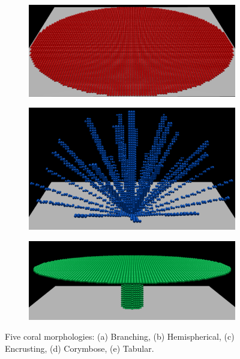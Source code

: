 \documentclass[9pt]{pnas-new}
\begin{document}
\begin{figure}[!htb]
\begin{subfigure}{0.3\textwidth}
    \end{subfigure}
    \begin{subfigure}{0.3\textwidth}
        \includegraphics[width=\textwidth]{fig/encrusting.png}
        \caption{}
    \end{subfigure}
    \begin{subfigure}{0.3\textwidth}
        \includegraphics[width=\textwidth]{fig/corymbose.png}
        \caption{}
    \end{subfigure}
    \begin{subfigure}{0.3\textwidth}
        \includegraphics[width=\textwidth]{fig/tabular.png}
        \caption{}
    \end{subfigure}
    \caption{Five coral morphologies: (a) Branching, (b) Hemispherical, (c) Encrusting, (d) Corymbose, (e) Tabular.}
    \label{fig:morphologies}
\end{figure}
\end{document}
